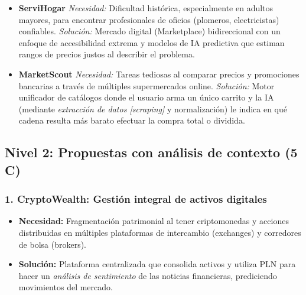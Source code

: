\begin{itemize}
    \item \textbf{ServiHogar}
    \newline \textit{Necesidad:} Dificultad histórica, especialmente en adultos mayores, para encontrar profesionales de oficios (plomeros, electricistas) confiables.
    \newline \textit{Solución:} Mercado digital (Marketplace) bidireccional con un enfoque de accesibilidad extrema y modelos de IA predictiva que estiman rangos de precios justos al describir el problema.

    \item \textbf{MarketScout}
    \newline \textit{Necesidad:} Tareas tediosas al comparar precios y promociones bancarias a través de múltiples supermercados online.
    \newline \textit{Solución:} Motor unificador de catálogos donde el usuario arma un único carrito y la IA (mediante \textit{extracción de datos [scraping]} y normalización) le indica en qué cadena resulta más barato efectuar la compra total o dividida.
\end{itemize}

\newpage

\subsection{Nivel 2: Propuestas con análisis de contexto (5 C)}

\subsubsection{1. CryptoWealth: Gestión integral de activos digitales}

\begin{itemize}
    \item \textbf{Necesidad:} Fragmentación patrimonial al tener criptomonedas y acciones distribuidas en múltiples plataformas de intercambio (exchanges) y corredores de bolsa (brokers).
    \item \textbf{Solución:} Plataforma centralizada que consolida activos y utiliza PLN para hacer un \textit{análisis de sentimiento} de las noticias financieras, prediciendo movimientos del mercado.
\end{itemize}

